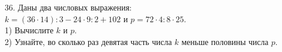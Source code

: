 36. Даны два числовых выражения:\\
$k=(36\cdot14):3-24\cdot9:2+102$ и $p=72\cdot4:8\cdot25.$\\
1) Вычислите $k$ и $p.$\\
2) Узнайте, во сколько раз девятая часть числа $k$ меньше половины числа $p.$\\
